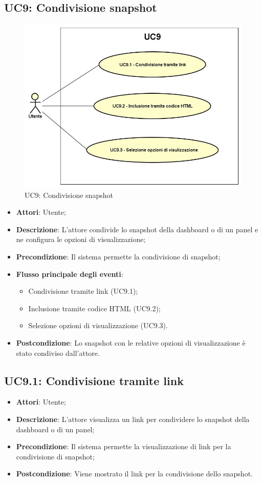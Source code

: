 \subsection{UC9: Condivisione snapshot}
\begin{figure} [H]
	\centering
	\includegraphics[scale=0.45]{Img/UC9}
	\caption{UC9: Condivisione snapshot}\label{}
\end{figure}
\begin{itemize}
	\item \textbf{Attori}: Utente;
	\item \textbf{Descrizione}: L'attore condivide lo snapshot della dashboard o di un panel e ne configura le opzioni di visualizzazione;
	\item \textbf{Precondizione}: Il sistema permette la condivisione di snapshot;
	\item \textbf{Flusso principale degli eventi}:
	\begin{itemize}
		\item Condivisione tramite link (UC9.1);
		\item Inclusione tramite codice HTML (UC9.2);
		\item Selezione opzioni di visualizzazione (UC9.3).
	\end{itemize}
	\item \textbf{Postcondizione}: Lo snapshot con le relative opzioni di visualizzazione è stato condiviso dall'attore.
\end{itemize}

\subsection{UC9.1: Condivisione tramite link}
\begin{itemize}
	\item \textbf{Attori}: Utente;
	\item \textbf{Descrizione}: L'attore visualizza un link per condividere lo snapshot della dashboard o di un panel;
	\item \textbf{Precondizione}: Il sistema permette la visualizzazione di link per la condivisione di snapshot;
	\item \textbf{Postcondizione}: Viene mostrato il link per la condivisione dello snapshot.
\end{itemize}


